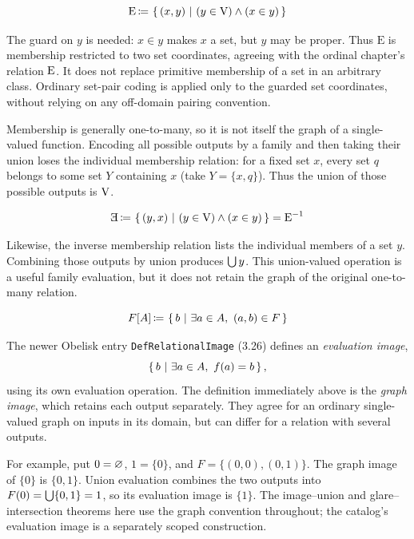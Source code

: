 \begin{definition}
\[
\mbox{E} \,{\coloneqq}\, \left\{\,(x,y)\ \middle|\ (y\in\mathrm{V})\land(x\in y)\,\right\}
\]
\end{definition}
The guard on $y$ is needed: $x\in y$ makes $x$ a set, but $y$
may be proper. Thus $\mbox{E}$ is membership restricted to two set
coordinates, agreeing with the ordinal chapter's relation $\mathrm{E}$.
It does not replace primitive membership of a set in an arbitrary
class. Ordinary set-pair coding is applied only to the guarded set
coordinates, without relying on any off-domain pairing convention.
\begin{remark}
Membership is generally one-to-many, so it is not itself the graph of a
single-valued function. Encoding all possible outputs by a family and
then taking their union loses the individual membership relation: for a
fixed set $x$, every set $q$ belongs to some set $Y$ containing $x$ (take
$Y=\{x,q\}$). Thus the union of those possible outputs is $\mathrm{V}$.
\end{remark}
\begin{definition}
\[
\invE \ceq \cc{(y,x)}{(y\in\V)\land(x\in y)} = \mbox{E}^{-1}
\]
\end{definition}
\begin{remark}
Likewise, the inverse membership relation lists the individual members
of a set $y$. Combining those outputs by union produces $\bigcup y$.
This union-valued operation is a useful family evaluation, but it does
not retain the graph of the original one-to-many relation.
\end{remark}
\begin{definition}
\[
F[A]\,{\coloneqq}\, \left\{\,b\ \middle|\ \exists a\in A,\  (a,b)\in F\,\right\}
\]
\end{definition}
\begin{note}
The newer Obelisk entry \texttt{Def\allowbreak{}Relational\allowbreak{}Image} (3.26) defines an
\emph{evaluation image},
\[
\left\{\,b\ \middle|\ \exists a\in A,\ f(a)=b\,\right\},
\]
using its own evaluation operation. The definition immediately above is the
\emph{graph image}, which retains each output separately. They agree
for an ordinary single-valued graph on inputs in its domain, but can
differ for a relation with several outputs.

For example, put $0=\varnothing$, $1=\{0\}$, and
$F=\{(0,0),(0,1)\}$. The graph image of $\{0\}$ is $\{0,1\}$.
Union evaluation combines the two outputs into
$F(0)=\bigcup\{0,1\}=1$, so its evaluation image is $\{1\}$.
The image--union and glare--intersection theorems here use the graph
convention throughout; the catalog's evaluation image is a separately
scoped construction.
\end{note}

